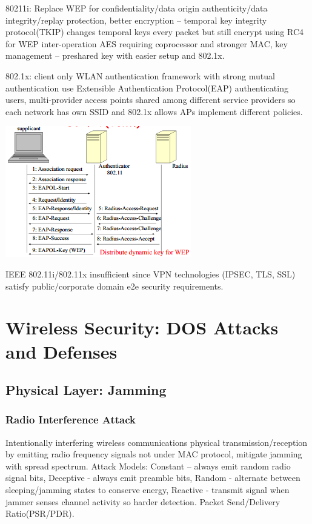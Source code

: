 \documentclass[9pt]{extarticle}
\begin{document}
\begin{multicols}{2}
80211i: Replace WEP for confidentiality/data origin authenticity/data integrity/replay protection, better encryption – temporal key integrity protocol(TKIP) changes temporal keys every packet but still encrypt using RC4 for WEP inter-operation AES requiring coprocessor and stronger MAC, key management – preshared key with easier setup and 802.1x.

802.1x: client only WLAN authentication framework with strong mutual authentication use Extensible Authentication Protocol(EAP) authenticating users, multi-provider access points shared among different service providers so each network has own SSID and 802.1x allows APs implement different policies.

\includegraphics{8021x.png}

IEEE 802.11i/802.11x insufficient since VPN technologies (IPSEC, TLS, SSL) satisfy public/corporate domain e2e security requirements.

\section{Wireless Security: DOS Attacks and Defenses}

\subsection{Physical Layer: Jamming}

\subsubsection{Radio Interference Attack}

Intentionally interfering wireless communications physical transmission/reception by emitting radio frequency signals not under MAC protocol, mitigate jamming with spread spectrum. Attack Models: Constant – always emit random radio signal bits, Deceptive - always emit preamble bits, Random - alternate between sleeping/jamming states to conserve energy, Reactive - transmit signal when jammer senses channel activity so harder detection. Packet Send/Delivery Ratio(PSR/PDR). 


\end{multicols}
\end{document}
